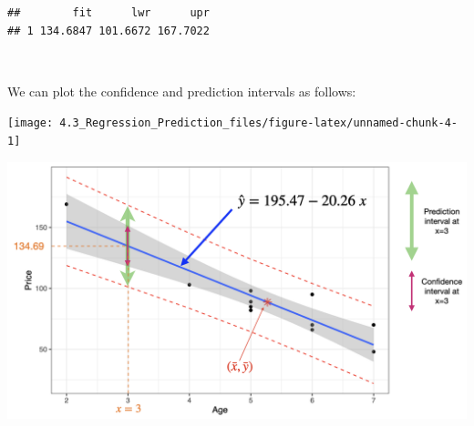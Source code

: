 \documentclass[
]{article}
\begin{document}
\begin{verbatim}
##        fit      lwr      upr
## 1 134.6847 101.6672 167.7022
\end{verbatim}

\(~\)

We can plot the confidence and prediction intervals as follows:

\begin{center}\texttt{[image: 4.3\_Regression\_Prediction\_files/figure-latex/unnamed-chunk-4-1]} \end{center}

\begin{center}\includegraphics[width=0.8\linewidth,height=0.8\textheight]{figures/predex2} \end{center}
\end{document}
